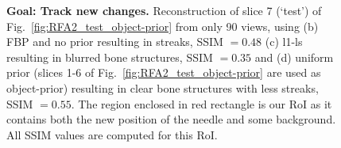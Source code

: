 \documentclass[journal]{IEEEtran}
\begin{document}
\begin{figure}[!h]
\caption[Representative results-1]{\textbf{Goal: Track new changes.}\small{ Reconstruction of slice 7 (`test') of Fig.~\ref{fig:RFA2_test_object-prior} from only 90 views, using (b) FBP and no prior resulting in streaks, SSIM $= 0.48$ (c) l1-ls resulting in blurred bone structures, SSIM $=0.35$ and (d) uniform prior (slices 1-6 of Fig.~\ref{fig:RFA2_test_object-prior} are used as object-prior) resulting in clear bone structures with less streaks, SSIM $=0.55$. The region enclosed in red rectangle is our RoI as it contains both the new position of the needle and some background. All SSIM values are computed for this RoI.}}
\label{fig:RFA2_very_few_views}
\end{figure}


\begin{figure}[!h]
\centering
{}\hfill
{}\hfill
{}\hfill
{}

\end{figure}
\end{document}
